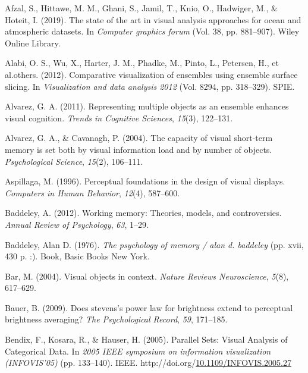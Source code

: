 \documentclass[print]{nuthesis}
\newlength{\cslhangindent}
\newenvironment{CSLReferences}[2]%
{\setlength{\parindent}{0pt}%
\everypar{\setlength{\hangindent}{\cslhangindent}}\ignorespaces}%
{\par}
\begin{document}
\hypertarget{refs}{}
\begin{CSLReferences}{1}{0}
\leavevmode{}%
Afzal, S., Hittawe, M. M., Ghani, S., Jamil, T., Knio, O., Hadwiger, M., \& Hoteit, I. (2019). The state of the art in visual analysis approaches for ocean and atmospheric datasets. In \emph{Computer graphics forum} (Vol. 38, pp. 881--907). Wiley Online Library.

\leavevmode{}%
Alabi, O. S., Wu, X., Harter, J. M., Phadke, M., Pinto, L., Petersen, H., et al.others. (2012). Comparative visualization of ensembles using ensemble surface slicing. In \emph{Visualization and data analysis 2012} (Vol. 8294, pp. 318--329). SPIE.

\leavevmode{}%
Alvarez, G. A. (2011). Representing multiple objects as an ensemble enhances visual cognition. \emph{Trends in Cognitive Sciences}, \emph{15}(3), 122--131.

\leavevmode{}%
Alvarez, G. A., \& Cavanagh, P. (2004). The capacity of visual short-term memory is set both by visual information load and by number of objects. \emph{Psychological Science}, \emph{15}(2), 106--111.

\leavevmode{}%
Aspillaga, M. (1996). Perceptual foundations in the design of visual displays. \emph{Computers in Human Behavior}, \emph{12}(4), 587--600.

\leavevmode{}%
Baddeley, A. (2012). Working memory: Theories, models, and controversies. \emph{Annual Review of Psychology}, \emph{63}, 1--29.

\leavevmode{}%
Baddeley, Alan D. (1976). \emph{The psychology of memory / alan d. baddeley} (pp. xvii, 430 p. :). Book, Basic Books New York.

\leavevmode{}%
Bar, M. (2004). Visual objects in context. \emph{Nature Reviews Neuroscience}, \emph{5}(8), 617--629.

\leavevmode{}%
Bauer, B. (2009). Does stevens's power law for brightness extend to perceptual brightness averaging? \emph{The Psychological Record}, \emph{59}, 171--185.

\leavevmode{}%
Bendix, F., Kosara, R., \& Hauser, H. (2005). {Parallel Sets: Visual Analysis of Categorical Data}. In \emph{2005 IEEE symposium on information visualization (INFOVIS'05)} (pp. 133--140). IEEE. http://doi.org/\href{https://doi.org/10.1109/INFOVIS.2005.27}{10.1109/INFOVIS.2005.27}


\end{CSLReferences}
\end{document}
